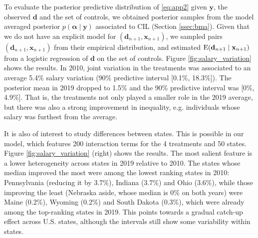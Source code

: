 \documentclass[12pt]{article}
\newcommand{\E}{\mbox{\textup{E}}}
\newcommand{\mb}[1]{\mathbf{#1}}
\newcommand{\by}{{\mb{y}}}
\newcommand{\bd}{{\mb{d}}}
\newcommand{\balpha}{{\bm{\alpha}}}
\newcommand{\omcom}[1]{ {\color{blue} #1} }
\begin{document}
To evaluate the posterior predictive distribution of \eqref{eq:app2} given $\by$, the observed $\bd$ and the set of controls, we obtained posterior samples from the model averaged posterior $p(\balpha \mid \by)$ associated to CIL (Section \ref{ssec:bma}). Given that we do not have an explicit model for $(\bd_{n+1}, \mb{x}_{n+1})$, we sampled pairs $(\mb{d}_{n+1}, \mb{x}_{n+1})$ from their empirical distribution, and estimated $\E(\mb{d}_{n+1} \mid \mb{x}_{n+1})$ from a logistic regression of $\bd$ on the set of controls.
Figure \ref{fig:salary_variation} shows the results. In 2010, joint variation in the treatments was associated to an average 5.4\% salary variation (90\% predictive interval [0.1\%, 18.3\%]). The posterior mean in 2019 dropped to 1.5\% and the 90\% predictive interval was [0\%, 4.9\%]. That is, the treatments not only played a smaller role in the 2019 average, but there was also a strong improvement in inequality, e.g. individuals whose salary was furthest from the average. %

It is also of interest to study differences between states. This is possible in our model, which features 200 interaction terms for the 4 treatments and 50 states. Figure \ref{fig:salary_variation} (right) shows the results. The most salient feature is a lower heterogeneity across states in 2019 relative to 2010.
The states whose median improved the most were among the lowest ranking states in 2010: Pennsylvania (reducing it by 3.7\%), Indiana (3.7\%) and Ohio (3.6\%), while those improving the least (Nebraska aside, whose median is 0\% on both years) were Maine (0.2\%), Wyoming (0.2\%) and South Dakota (0.3\%), which were already among the top-ranking states in 2019. This points towards a gradual catch-up effect across U.S. states, although the intervals still show some variability within states.
\end{document}
